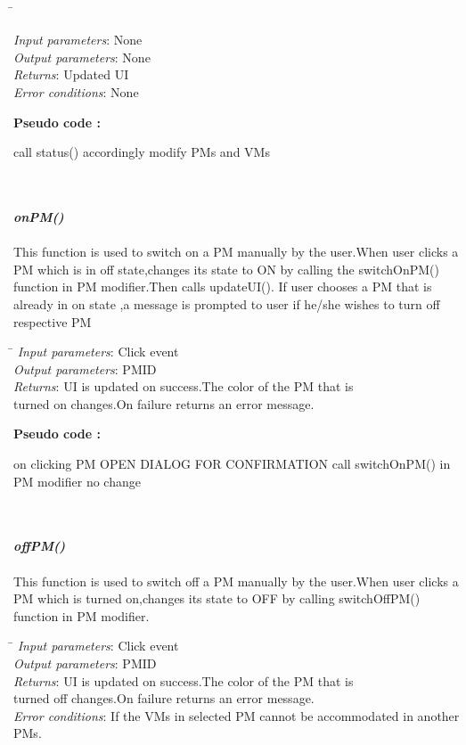 \documentclass[a4paper,11pt]{article}
\begin{document}
\\\begin{tabbing}
  \hspace*{4cm}\= \kill

\emph{Input parameters}\>: None
\\
\emph{Output parameters}\>: None\\
\emph{Returns}\>: Updated UI\\
\emph{Error conditions}\>: None\\
\end{tabbing}
\textbf{Pseudo code :}
\begin{algorithmic}[1]
 \STATE call status()
 \STATE accordingly modify PMs and VMs
\end{algorithmic}
\mbox{}\\\\
\emph{\bf onPM()}\\\\
This function is used to switch on a PM manually by the user.When user clicks a PM  which is in off state,changes its state to ON by calling the switchOnPM() function in PM modifier.Then calls updateUI().
If user chooses a PM that is already in on state ,a message is prompted to user if he/she wishes to turn off respective PM
\\\begin{tabbing}
  \hspace*{4cm}\= \kill
\emph{Input parameters}\>: Click event\\
\emph{Output parameters}\>: PM\textunderscore ID\\
\emph{Returns}\>: UI is updated on success.The color of the PM that is \\ \> turned on changes.On failure returns an error message.\\ 
\end{tabbing}
\textbf{Pseudo code :}
\begin{algorithmic}[1]
 \STATE on clicking PM 
 \STATE OPEN DIALOG FOR CONFIRMATION
 \STATE call switchOnPM() in PM modifier
 \ELSE 
 \STATE no change
 \ENDIF
 \ENDIF
\end{algorithmic}
\mbox{}\\\\
\emph{\bf offPM()}
\\\\
This function is used to switch off a PM manually by the user.When user clicks a PM which is turned on,changes its state to OFF by calling switchOffPM() function in PM modifier.
\\\begin{tabbing}
  \hspace*{4cm}\= \kill
  \emph{Input parameters}\>: Click event\\
  \emph{Output parameters}\>: PM\textunderscore ID\\
  \emph{Returns}\>: UI is updated on success.The color of the PM that is \\ \> turned off changes.On failure returns an error message.\\
  \emph{Error conditions}\>: If the VMs in selected PM cannot be accommodated in another PMs.
  \end{tabbing}
\end{document}
